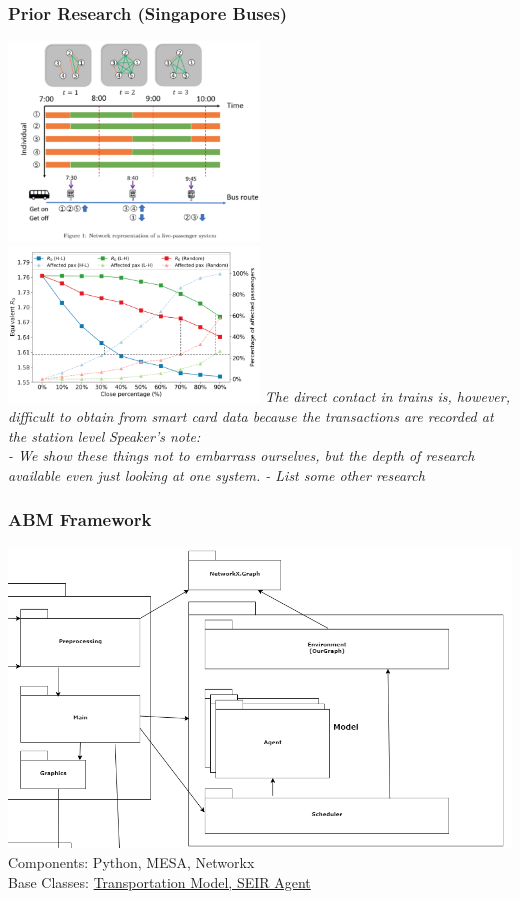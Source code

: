 \documentclass{beamer}
\begin{document}
\begin{frame}
\frametitle{Prior Research (Singapore Buses)}
\includegraphics[width=0.5\textwidth]{Scratch_Visuals/Singapore_1.png}%
\includegraphics[width=0.5\textwidth]{Scratch_Visuals/Singapore_2.png}
\textit{The direct contact in trains is, however, difficult to obtain from smart card data because the transactions are recorded at the station level}
\cite{singapore_bus_2020}
\textit{Speaker's note:\\
- We show these things not to embarrass ourselves, but the depth of research available even just looking at one system.
- List some other research
}
\end{frame}
\begin{frame}
\frametitle{ABM Framework}
\includegraphics[width=1.0\textwidth]{Scratch_Visuals/covid_framework_summary.png}
Components: Python, MESA, Networkx\\
Base Classes: \href{https://github.com/cheung-ho-lum/NS_Epidemics_ABM_Approach/blob/master/Report/Design_doc_for_expansion_of_subway_model.pdf}{Transportation Model, SEIR Agent}
\end{frame}
\end{document}
